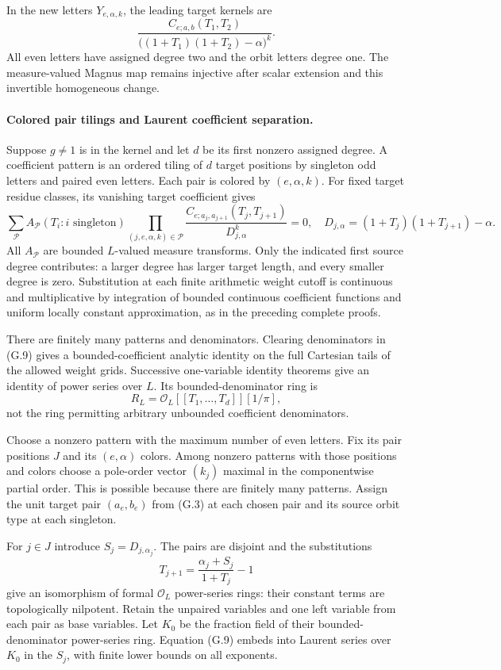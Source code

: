 \documentclass[11pt,a4paper]{article}
\theoremstyle{definition}
\begin{document}
In the new letters $Y_{e,\alpha,k}$, the leading target kernels are
\[
 \frac{C_{e;a,b}(T_1,T_2)}
      {\bigl((1+T_1)(1+T_2)-\alpha\bigr)^k}.                   \tag{G.8}
\]
All even letters have assigned degree two and the orbit letters degree one. The measure-valued Magnus map remains injective after scalar extension and this invertible homogeneous change.

\paragraph{Colored pair tilings and Laurent coefficient separation.}
Suppose $g\ne1$ is in the kernel and let $d$ be its first nonzero assigned degree. A coefficient pattern is an ordered tiling of $d$ target positions by singleton odd letters and paired even letters. Each pair is colored by $(e,\alpha,k)$. For fixed target residue classes, its vanishing target coefficient gives
\[
 \sum_{\mathcal P} A_{\mathcal P}(T_i:i\text{ singleton})
 \prod_{(j,e,\alpha,k)\in\mathcal P}
 \frac{C_{e;a_j,a_{j+1}}(T_j,T_{j+1})}{D_{j,\alpha}^k}=0,
 \quad D_{j,\alpha}=(1+T_j)(1+T_{j+1})-\alpha.                \tag{G.9}
\]
All $A_{\mathcal P}$ are bounded $L$-valued measure transforms. Only the indicated first source degree contributes: a larger degree has larger target length, and every smaller degree is zero. Substitution at each finite arithmetic weight cutoff is continuous and multiplicative by integration of bounded continuous coefficient functions and uniform locally constant approximation, as in the preceding complete proofs.

There are finitely many patterns and denominators. Clearing denominators in (G.9) gives a bounded-coefficient analytic identity on the full Cartesian tails of the allowed weight grids. Successive one-variable identity theorems give an identity of power series over $L$. Its bounded-denominator ring is
\[
 R_L=\mathcal O_L[[T_1,\ldots,T_d]][1/\pi],
\]
not the ring permitting arbitrary unbounded coefficient denominators.

Choose a nonzero pattern with the maximum number of even letters. Fix its pair positions $J$ and its $(e,\alpha)$ colors. Among nonzero patterns with those positions and colors choose a pole-order vector $(k_j)$ maximal in the componentwise partial order. This is possible because there are finitely many patterns. Assign the unit target pair $(a_e,b_e)$ from (G.3) at each chosen pair and its source orbit type at each singleton.

For $j\in J$ introduce $S_j=D_{j,\alpha_j}$. The pairs are disjoint and the substitutions
\[
 T_{j+1}=\frac{\alpha_j+S_j}{1+T_j}-1
\]
give an isomorphism of formal $\mathcal O_L$ power-series rings: their constant terms are topologically nilpotent. Retain the unpaired variables and one left variable from each pair as base variables. Let $K_0$ be the fraction field of their bounded-denominator power-series ring. Equation (G.9) embeds into Laurent series over $K_0$ in the $S_j$, with finite lower bounds on all exponents.
\end{document}
